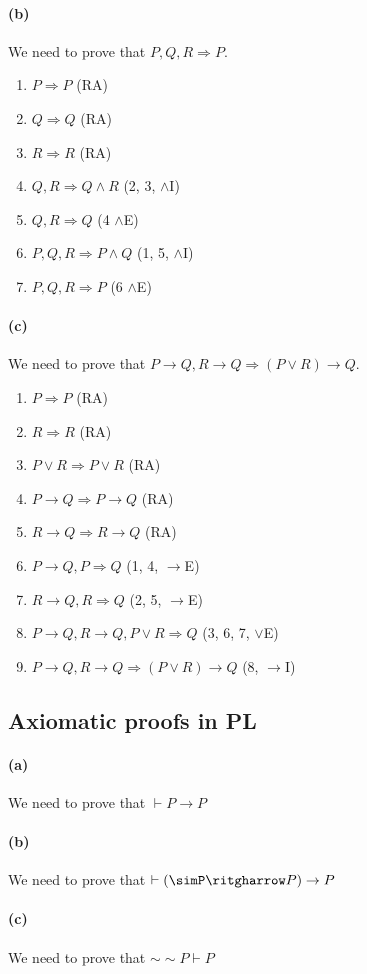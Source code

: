 \documentclass[sloppy, journal, git, bytitle]{humapap}
\begin{document}
\paragraph{(b)} We need to prove that $P, Q, R\Rightarrow P$.
\begin{enumerate}
	\item $P\Rightarrow P$ \hfil (RA)
	\item $Q\Rightarrow Q$ \hfil (RA)
	\item $R\Rightarrow R$ \hfil (RA)
	\item $Q, R\Rightarrow Q\wedge R$ \hfil (2, 3, $\wedge$I)
	\item $Q, R\Rightarrow Q$ \hfil (4 $\wedge$E)
	\item $P, Q, R\Rightarrow P\wedge Q$ \hfil (1, 5, $\wedge$I)
	\item $P, Q, R\Rightarrow P$ \hfil (6 $\wedge$E)
\end{enumerate}


\paragraph{(c)} We need to prove that $P\rightarrow Q, R\rightarrow Q \Rightarrow (P\vee R)\rightarrow Q$. 
\begin{enumerate}
	\item $P\Rightarrow P$ \hfil (RA)
	\item $R\Rightarrow R$ \hfil (RA)
	\item $P\vee R\Rightarrow P\vee R$ \hfil (RA)
	\item $P\rightarrow Q\Rightarrow P\rightarrow Q$ \hfil (RA)
	\item $R\rightarrow Q\Rightarrow R\rightarrow Q$ \hfil (RA)
	\item $P\rightarrow Q, P \Rightarrow Q$ \hfil (1, 4, $\rightarrow$E)
	\item $R\rightarrow Q, R \Rightarrow Q$ \hfil (2, 5, $\rightarrow$E)
	\item $P\rightarrow Q, R\rightarrow Q, P\vee R\Rightarrow Q$ \hfil (3, 6, 7, $\vee$E)
	\item $P\rightarrow Q, R\rightarrow Q\Rightarrow (P\vee R)\rightarrow Q$ \hfil (8, $\rightarrow$I)
\end{enumerate}

\subsection{Axiomatic proofs in PL}
\paragraph{(a)} We need to prove that $\vdash P\rightarrow P$
\paragraph{(b)} We need to prove that $\vdash(\simP\ritgharrow P)\rightarrow P$
\paragraph{(c)} We need to prove that $\sim\sim P\vdash P$

\standardbib
\end{document}
